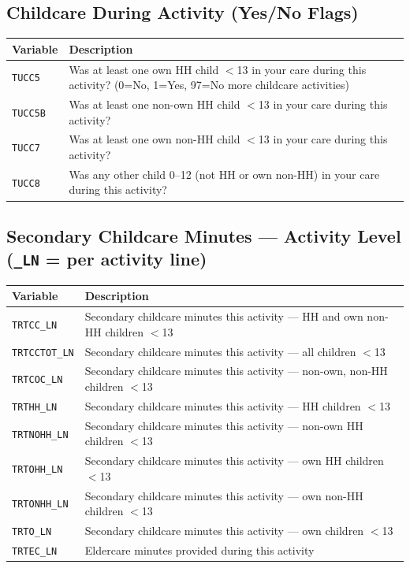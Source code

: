 \documentclass[11pt, a4paper]{article}
\begin{document}
\subsection{Childcare During Activity (Yes/No Flags)}
\begin{longtable}{L{3.5cm} L{12cm}}
\toprule \textbf{Variable} & \textbf{Description} \\ \midrule \endhead
\bottomrule \endfoot
\texttt{TUCC5}  & Was at least one own HH child $<$13 in your care during this
                  activity? (0=No, 1=Yes, 97=No more childcare activities) \\
 \texttt{TUCC5B} & Was at least one non-own HH child $<$13 in your care during
                  this activity? \\
\texttt{TUCC7}  & Was at least one own non-HH child $<$13 in your care during
                  this activity? \\
 \texttt{TUCC8}  & Was any other child 0--12 (not HH or own non-HH) in your care
                  during this activity? \\
\end{longtable}

\subsection{Secondary Childcare Minutes --- Activity Level (\texttt{\_LN} = per activity line)}
\begin{longtable}{L{3.8cm} L{12cm}}
\toprule \textbf{Variable} & \textbf{Description} \\ \midrule \endhead
\bottomrule \endfoot
\texttt{TRTCC\_LN}    & Secondary childcare minutes this activity ---
                         HH and own non-HH children $<$13 \\
 \texttt{TRTCCTOT\_LN} & Secondary childcare minutes this activity ---
                         all children $<$13 \\
\texttt{TRTCOC\_LN}   & Secondary childcare minutes this activity ---
                         non-own, non-HH children $<$13 \\
 \texttt{TRTHH\_LN}    & Secondary childcare minutes this activity ---
                         HH children $<$13 \\
\texttt{TRTNOHH\_LN}  & Secondary childcare minutes this activity ---
                         non-own HH children $<$13 \\
 \texttt{TRTOHH\_LN}   & Secondary childcare minutes this activity ---
                         own HH children $<$13 \\
\texttt{TRTONHH\_LN}  & Secondary childcare minutes this activity ---
                         own non-HH children $<$13 \\
 \texttt{TRTO\_LN}     & Secondary childcare minutes this activity ---
                         own children $<$13 \\
\texttt{TRTEC\_LN}    & Eldercare minutes provided during this activity \\
\end{longtable}
\end{document}

